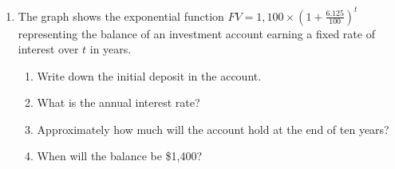 \documentclass[12pt, twoside]{article}
\begin{document}
\begin{enumerate}
\item The graph shows the exponential function $\displaystyle FV=1,100 \times \left( 1+\frac{6.125}{100} \right)^t$ representing the balance of an investment account earning a fixed rate of interest over $t$ in years.
\begin{multicols}{2}
    \begin{enumerate}[itemsep=1cm]
        \item Write down the initial deposit in the account.
        \item What is the annual interest rate?
        \item Approximately how much will the account hold at the end of ten years?
        \item When will the balance be \$1,400?
    \end{enumerate}
    \begin{center}
    \end{center}
    \end{multicols}

\end{enumerate}
\end{document}
